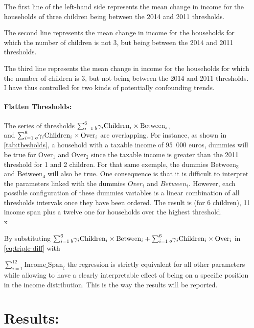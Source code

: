 The first line of the left-hand side represents the mean change in income for the households of three children being between the 2014 and 2011 thresholds.

The second line represents the mean change in income for the households for which the number of children is not 3, but being between the 2014 and 2011 thresholds.

The third line represents the mean change in income for the households for which the number of children is 3, but not being between the 2014 and 2011 thresholds. I have thus controlled for two kinds of potentially confounding trends.

\paragraph{Flatten Thresholds:}
The series of thresholds $ \sum_{i=1}^6 {\prescript{}{b}\gamma_{i} \text{Children}_i \times \text{Between}_i}$,\\
     and $\sum_{i=1}^6 {\prescript{}{o}\gamma_{i} \text{Children}_i \times \text{Over}_i}$ are overlapping. For instance, as shown in \autoref{tab:thesholds},  a household with a taxable income of \mbox{95 000} euros, dummies will be true for $\text{Over}_1$ and $\text{Over}_2$ since the taxable income is greater than the 2011 threshold for 1 and 2 children. For that same exemple, the dummies $\text{Between}_3$ and $\text{Between}_4$ will also be true. 
    One consequence is that it is difficult to interpret the parameters linked with the dummies $Over_i$ and $Between_i$. However, each possible configuration of these dummies variables is a linear combination of all thresholds intervals once they have been ordered. The result is (for 6 children), 11 income span plus a twelve one for households over the highest threshold. \\x

    By substituting   $ \sum_{i=1}^6 {\prescript{}{b}\gamma_{i} \text{Children}_i \times \text{Between}_i} + \sum_{i=1}^6 {\prescript{}{o}\gamma_{i}\text{Children}_i \times \text{Over}_i} $ 
    in \autoref{eq:triple-diff} with  

    $ \sum_{i=1}^{12} \text{Income\_Span}_i $ the regression is strictly equivalent for all other parameters while allowing to have a clearly interpretable effect of being on a specific position in the income distribution. This is the way the results will be reported.


\section{Results: }



